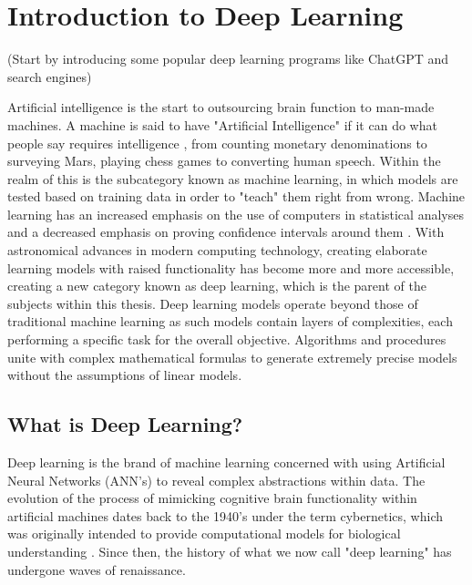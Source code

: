 \chapter{Introduction to Deep Learning}

(Start by introducing some popular deep learning programs like ChatGPT and search engines)

Artificial intelligence is the start to outsourcing brain function to man-made machines.  A machine is said to have "Artificial Intelligence" if it can do what people say requires intelligence \cite{jackson2019introduction}, from counting monetary denominations to surveying Mars, playing chess games to converting human speech.  Within the realm of this is the subcategory known as machine learning, in which models are tested based on training data in order to "teach" them right from wrong.  Machine learning has an increased emphasis on the use of computers in statistical analyses and a decreased emphasis on proving confidence intervals around them \cite{Goodfellow-et-al-2016}.  With astronomical advances in modern computing technology, creating elaborate learning models with raised functionality has become more and more accessible, creating a new category known as deep learning, which is the parent of the subjects within this thesis.  Deep learning models operate beyond those of traditional machine learning as such models contain layers of complexities, each performing a specific task for the overall objective.  Algorithms and procedures unite with complex mathematical formulas to generate extremely precise models without the assumptions of linear models.



\section{What is Deep Learning?} %

Deep learning is the brand of machine learning concerned with using Artificial Neural Networks (ANN's) to reveal complex abstractions within data.
The evolution of the process of mimicking cognitive brain functionality within artificial machines dates back to the 1940's under the term cybernetics, which was originally intended to provide computational models for biological understanding \cite{Goodfellow-et-al-2016}.  Since then, the history of what we now call "deep learning" has undergone waves of renaissance.

